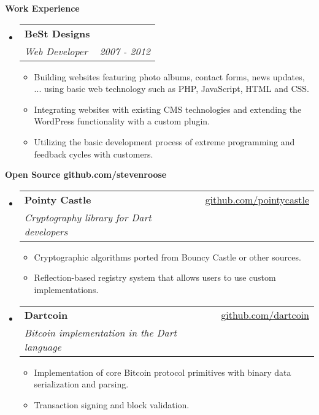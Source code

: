\documentclass[letterpaper,11pt]{article}
\makeatletter
\newcommand{\resheading}[1]{{\large \colorbox{mygrey}{\begin{minipage}{\textwidth}{\textbf{#1 \vphantom{p\^{E}}}}\end{minipage}}}}
\newcommand{\ressubheading}[4]{
\begin{tabular*}{7.3in}{l@{\extracolsep{\fill}}r}
		\textbf{#1} & #2 \\
		\textit{#3} & \textit{#4} \\
\end{tabular*}\vspace{-6pt}}
\newcommand{\resitem}[1]{\item #1 \vspace{-2pt}}
\makeatother
\begin{document}
\resheading{Work Experience}
\begin{itemize}[leftmargin=*]

\item[]
	\ressubheading{BeSt Designs}{ }{Web Developer}{2007 - 2012}
	\begin{itemize}
		\resitem{Building websites featuring photo albums, contact forms, news updates, ... using basic web technology such as PHP, JavaScript, HTML and CSS.}
		\resitem{Integrating websites with existing CMS technologies and extending the WordPress functionality with a custom plugin.}
		\resitem{Utilizing the basic development process of extreme programming and feedback cycles with customers.}
	\end{itemize}

\end{itemize}


\resheading{Open Source \hfill github.com/stevenroose}
\begin{itemize}[leftmargin=*]

\item[]
	\ressubheading{Pointy Castle}{\href{https://github.com/pointycastle}{github.com/pointycastle}}{Cryptography library for Dart developers}{ }
	\begin{itemize}
		\resitem{Cryptographic algorithms ported from Bouncy Castle or other sources.}
		\resitem{Reflection-based registry system that allows users to use custom implementations.}
	\end{itemize}

\item[]
	\ressubheading{Dartcoin}{\href{https://github.com/dartcoin}{github.com/dartcoin}}{Bitcoin implementation in the Dart language}{ }
	\begin{itemize}
		\resitem{Implementation of core Bitcoin protocol primitives with binary data serialization and parsing.}
		\resitem{Transaction signing and block validation.}
	\end{itemize}

\end{itemize}

\newpage
\end{document}
